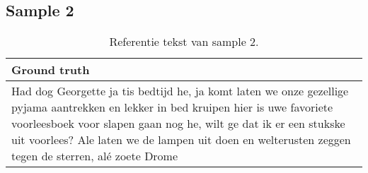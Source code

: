 \subsection{Sample 2}

\begin{table}[htbp]
    \centering
    \label{tab:groundtruth_sample2}
    \begin{tabularx}{\textwidth}{|X|}
        \hline
        \textbf{Ground truth} \\
        
        \hline
        Had dog Georgette ja tis bedtijd he, ja komt laten we onze gezellige pyjama aantrekken en lekker in bed kruipen hier is uwe favoriete voorleesboek voor slapen gaan nog he, wilt ge dat ik er een stukske uit voorlees? Ale laten we de lampen uit doen en welterusten zeggen tegen de sterren, alé zoete Drome \\
        \hline
    \end{tabularx}
    \caption{Referentie tekst van sample 2.}
\end{table}

